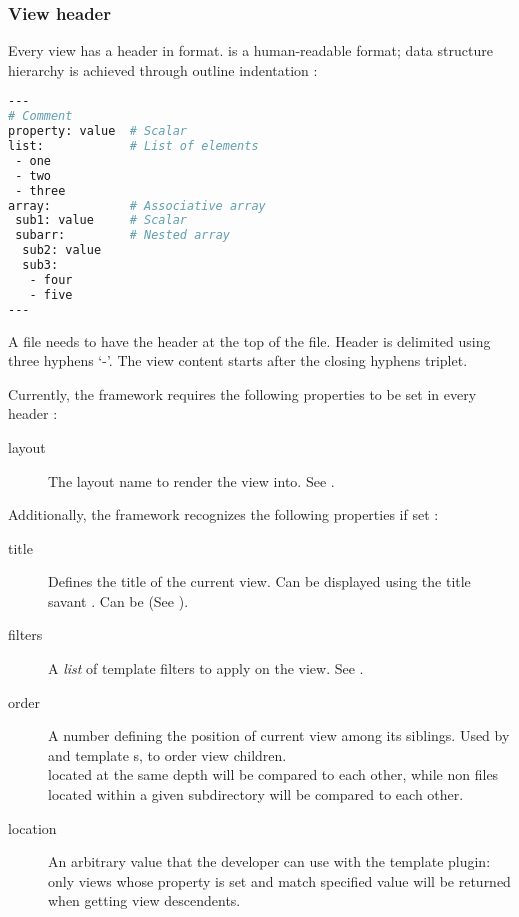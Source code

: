\documentclass[pdftex,12pt,a4paper]{article}
\begin{document}
\subsubsection{View header} \label{sec:view-header}

Every view has a header in  format.  is a human-readable format; data structure hierarchy is achieved through outline indentation :
\begin{lstlisting}[label="yaml-sample",caption="YAML format sample",language=bash]
---
# Comment
property: value  # Scalar
list:			 # List of elements
 - one
 - two
 - three
array:			 # Associative array
 sub1: value	 # Scalar
 subarr:		 # Nested array
  sub2: value
  sub3:
   - four
   - five
---
\end{lstlisting}

A  file needs to have the header at the top of the file. Header is delimited using three hyphens `-'. The view content starts after the closing hyphens triplet.

Currently, the framework requires the following properties to be set in every header :
\begin{description}
	\item[layout] The layout name to render the view into. See .
\end{description}

Additionally, the framework recognizes the following properties if set :
\begin{description}
	\item[title] Defines the title of the current view. Can be displayed using the title savant . Can be  (See ).
	\item[filters] A \emph{list} of template filters to apply on the view. See .
	\item[order] A number defining the position of current view among its siblings. Used by  and  template s,  to order view children.\\
	 located at the same depth will be compared to each other, while non  files located within a given subdirectory will be compared to each other.
	\item[location] An arbitrary value that the developer can use with the  template plugin: only views whose  property is set and match specified value will be returned when getting view descendents.
\end{description}
\end{document}

